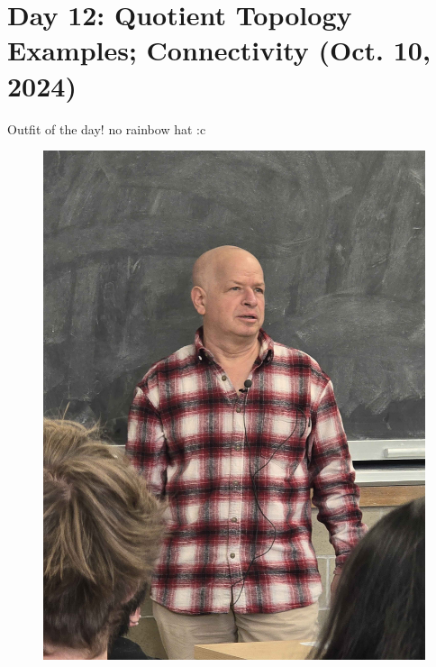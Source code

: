 \section{Day 12: Quotient Topology Examples; Connectivity (Oct. 10, 2024)}
Outfit of the day! no rainbow hat :c
\begin{figure}[h]
    \centering
    \includegraphics[scale=0.1]{MAT327 Notes/Dror Shirts/dror day 12 shirt.jpg}
\end{figure}

